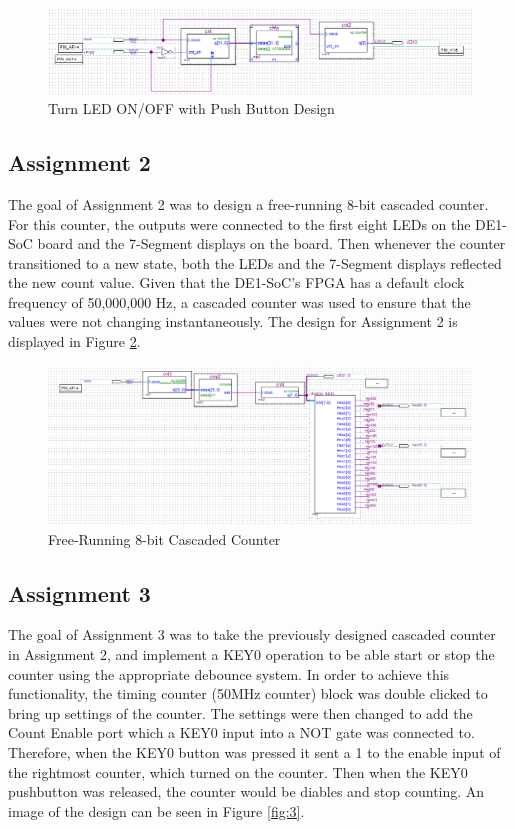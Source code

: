 \documentclass[
	letterpaper, %
	10pt, %
]{CSUniSchoolLabReport}
\begin{document}
\begin{figure}[H]
  \centering
  \includegraphics[width=.9\textwidth]{Figures/debounce_t.png}
  \caption{Turn LED ON/OFF with Push Button Design}
  \label{fig:1}
\end{figure}

\subsection{Assignment 2}

\hspace{.5 in} The goal of Assignment 2 was to design a free-running 8-bit cascaded counter. For this counter, the outputs were connected to the first eight LEDs on the DE1-SoC board and the 7-Segment displays on the board. Then whenever the counter transitioned to a new state, both the LEDs and the 7-Segment displays reflected the new count value. Given that the DE1-SoC’s FPGA has a default clock frequency of 50,000,000 Hz, a cascaded counter was used to ensure that the values were not changing instantaneously. The design for Assignment 2 is displayed in Figure \ref{fig:2}.

\begin{figure}[H]
  \centering
  \includegraphics[width=.72\textwidth]{Figures/Assign2.png}
  \caption{Free-Running 8-bit Cascaded Counter}
  \label{fig:2}
\end{figure}

\subsection{Assignment 3}

\hspace{.5 in} The goal of Assignment 3 was to take the previously designed cascaded counter in Assignment 2, and implement a KEY0 operation to be able start or stop the counter using the appropriate debounce system. In order to achieve this functionality, the timing counter (50MHz counter) block was double clicked to bring up settings of the counter.  The settings were then changed to add the Count Enable port which a KEY0 input into a NOT gate was connected to. Therefore, when the KEY0 button was pressed it sent a 1 to the enable input of the rightmost counter, which turned on the counter. Then when the KEY0 pushbutton was released, the counter would be diables and stop counting. An image of the design can be seen in Figure \ref{fig:3}.
\end{document}
